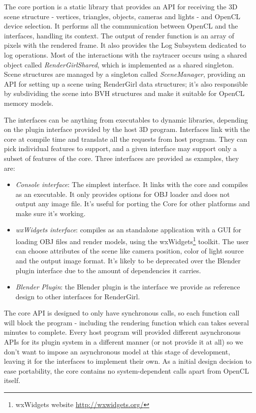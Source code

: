 \documentclass{vgtc}
\begin{document}
The core portion is a static library that provides an API for
receiving the 3D scene structure - vertices, triangles, objects,
cameras and lights - and OpenCL device selection. It performs all the
communication between OpenCL and the interfaces, handling its
context. The output of render function is an array of pixels with the
rendered frame. It also provides the Log Subsystem dedicated to log
operations. Most of the interactions with the raytracer occurs using a
shared object called \emph{RenderGirlShared}, which is implemented as
a shared singleton. Scene structures are managed by a singleton called
\emph{SceneManager}, providing an API for setting up a scene using
RenderGirl data structures; it's also responsible by subdividing the
scene into BVH structures and make it suitable for OpenCL memory
models.


The interfaces can be anything from executables to dynamic libraries,
depending on the plugin interface provided by the host 3D
program. Interfaces link with the core at compile time and translate
all the requests from host program. They can pick individual features
to support, and a given interface may support only a subset of
features of the core. Three interfaces are provided as examples, they
are:

\begin{itemize}
\item \emph{Console interface}: The simplest interface. It links with
  the core and compiles as an executable. It only provides options for
  OBJ loader and does not output any image file. It's useful for
  porting the Core for other platforms and make sure it's working.
\item \emph{wxWidgets interface}: compiles as an standalone
  application with a GUI for loading OBJ files and render models,
  using the wxWidgets\footnote{wxWidgets website
    \url{http://wxwidgets.org/}} toolkit. The user can choose
  attributes of the scene like camera position, color of light source
  and the output image format. It's likely to be deprecated over the
  Blender plugin interface due to the amount of dependencies it
  carries.
\item \emph{Blender Plugin}: the Blender plugin is the interface we
  provide as reference design to other interfaces for RenderGirl.
\end{itemize}

The core API is designed to only have synchronous calls, so each
function call will block the program - including the rendering
function which can takes several minutes to complete. Every host
program will provided different asynchronous APIs for its plugin
system in a different manner (or not provide it at all) so we don't
want to impose an asynchronous model at this stage of development,
leaving it for the interfaces to implement their own. As a initial
design decision to ease portability, the core contains no
system-dependent calls apart from OpenCL itself.
\end{document}
